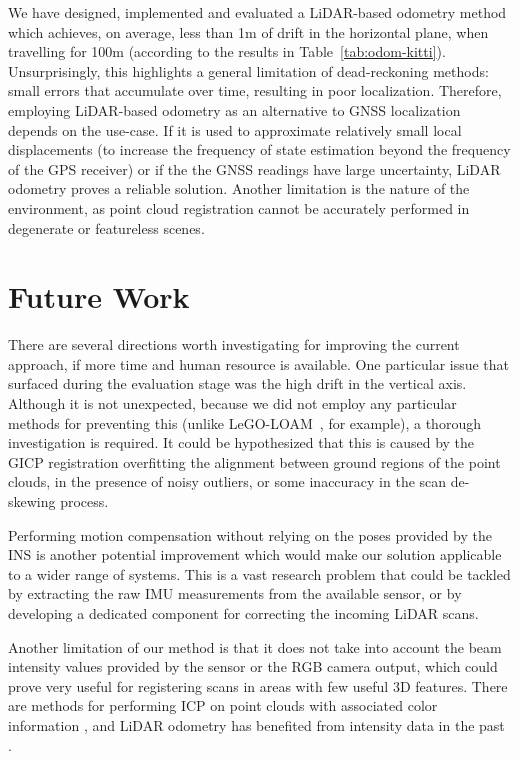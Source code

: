 \begin{compactenum}
    We have designed, implemented and evaluated a LiDAR-based odometry method which achieves, on average, less than 1m of drift in the horizontal plane, when travelling for 100m (according to the results in Table~\ref{tab:odom-kitti}). Unsurprisingly, this highlights a general limitation of dead-reckoning methods: small errors that accumulate over time, resulting in poor localization. Therefore, employing LiDAR-based odometry as an alternative to GNSS localization depends on the use-case. If it is used to approximate relatively small local displacements (\eg to increase the frequency of state estimation beyond the frequency of the GPS receiver) or if the the GNSS readings have large uncertainty, LiDAR odometry proves a reliable solution. Another limitation is the nature of the environment, as point cloud registration cannot be accurately performed in degenerate or featureless scenes.

\end{compactenum}


\section{Future Work}

There are several directions worth investigating for improving the current approach, if more time and human resource is available. One particular issue that surfaced during the evaluation stage was the high drift in the vertical axis. Although it is not unexpected, because we did not employ any particular methods for preventing this (unlike \mbox{LeGO-LOAM \cite{legoloam2018}}, for example), a thorough investigation is required. It could be hypothesized that this is caused by the GICP registration overfitting the alignment between ground regions of the point clouds, in the presence of noisy outliers, or some inaccuracy in the scan de-skewing process.

Performing motion compensation without relying on the poses provided by the INS is another potential improvement which would make our solution applicable to a wider range of systems. This is a vast research problem that could be tackled by extracting the raw IMU measurements from the available sensor, or by developing a dedicated component for correcting the incoming LiDAR scans.

Another limitation of our method is that it does not take into account the beam intensity values provided by the sensor or the RGB camera output, which could prove very useful for registering scans in areas with few useful 3D features. There are methods for performing ICP on point clouds with associated color information \cite{park2017colored}, and LiDAR odometry has benefited from intensity data in the past \cite{pfreundschuh2024coin}.

